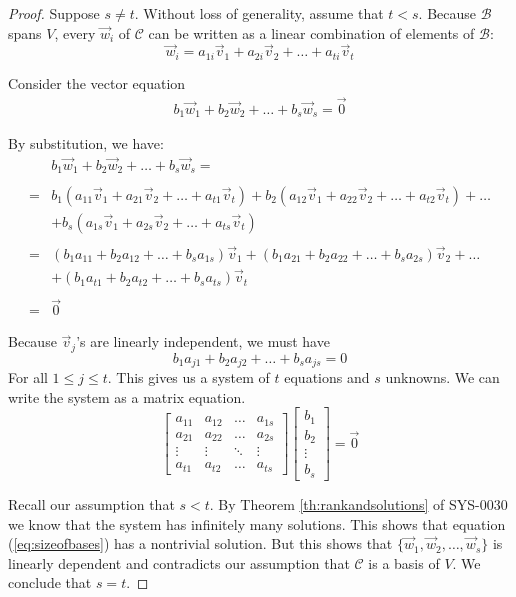\documentclass{ximera}
\begin{document}
\begin{proof}
Suppose $s\neq t$.  Without loss of generality, assume that $t<s$.  Because $\mathcal{B}$ spans $V$, every $\vec{w}_i$ of $\mathcal{C}$ can be written as a linear combination of elements of $\mathcal{B}$:
$$\vec{w}_i=a_{1i}\vec{v}_1+a_{2i}\vec{v}_{2}+\ldots +a_{ti}\vec{v}_t$$

Consider the vector equation
\begin{align}\label{eq:sizeofbases}
b_1\vec{w}_1+b_2\vec{w}_2+\ldots +b_s\vec{w}_s=\vec{0}
\end{align}

By substitution, we have:
\begin{align*}
    &b_1\vec{w}_1+b_2\vec{w}_2+\ldots +b_s\vec{w}_s=\\ \\
     =&b_1(a_{11}\vec{v}_1+a_{21}\vec{v}_{2}+\ldots +a_{t1}\vec{v}_t)+b_2(a_{12}\vec{v}_1+a_{22}\vec{v}_{2}+\ldots +a_{t2}\vec{v}_t)+\ldots\\
     &+b_s(a_{1s}\vec{v}_1+a_{2s}\vec{v}_{2}+\ldots +a_{ts}\vec{v}_t)\\ \\
     =&(b_1a_{11}+b_2a_{12}+\ldots +b_sa_{1s})\vec{v}_1
+(b_1a_{21}+b_2a_{22}+\ldots +b_sa_{2s})\vec{v}_2+
\ldots \\
&+(b_1a_{t1}+b_2a_{t2}+\ldots +b_sa_{ts})\vec{v}_t\\ \\
=&\vec{0}
\end{align*}

Because $\vec{v}_j$'s are linearly independent, we must have
$$b_1a_{j1}+b_2a_{j2}+\ldots +b_sa_{js}=0$$
For all $1\leq j\leq t$.
This gives us a system of $t$ equations and $s$ unknowns.  We can write the system as a matrix equation.
$$\begin{bmatrix}a_{11}&a_{12}&\ldots &a_{1s}\\a_{21}&a_{22}&\ldots &a_{2s}\\\vdots&\vdots&\ddots&\vdots\\a_{t1}&a_{t2}&\ldots&a_{ts}\end{bmatrix}\begin{bmatrix}b_1\\b_2\\\vdots\\b_s\end{bmatrix}=\vec{0}$$

Recall our assumption that $s<t$.  By Theorem \ref{th:rankandsolutions} of SYS-0030 we know that the system has infinitely many solutions.  This shows that equation (\ref{eq:sizeofbases}) has a nontrivial solution.  But this shows that $\{\vec{w}_1, \vec{w}_2,\ldots ,\vec{w}_s\}$ is linearly dependent and contradicts our assumption that $\mathcal{C}$ is a basis of $V$.  We conclude that $s=t$.
\end{proof}
\end{document}
